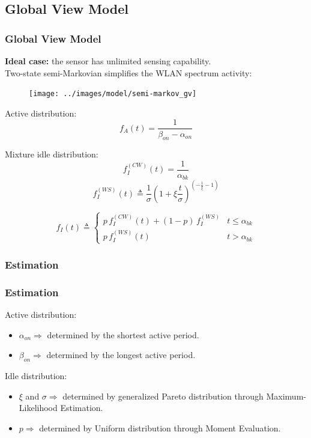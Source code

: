 \documentclass[9pt,handout,serif]{beamer}
\begin{document}
\subsection{Global View Model}
\begin{frame}[c]
	\frametitle{Global View Model}
	\textbf{Ideal case:} the sensor has unlimited sensing capability. \\
	Two-state semi-Markovian simplifies the WLAN spectrum activity:
	\begin{figure}
		\texttt{[image: ../images/model/semi-markov\_gv]}
	\end{figure}
	Active distribution:
	\begin{equation}
		\label{eq:Active}
		f_A(t) = \frac{1}{\beta_{on} - \alpha_{on}}
	\end{equation}
	
	Mixture idle distribution:
	\begin{equation}
		\label{eq:Idle}
		f^{(CW)}_I(t) = \frac{1}{\alpha_{bk}}
	\end{equation}
	\begin{equation}
		\label{eq:Idle}
		f^{(WS)}_I(t) \triangleq \frac{1}{\sigma}(1+\xi\frac{t}{\sigma})^{(-\frac{1}{\xi}-1)}
	\end{equation}
	
	\begin{equation}
		\label{eq:Idle}
		f_I(t) \triangleq
		\begin{cases}
			p \, f^{(CW)}_I(t) + (1 - p) \, f^{(WS)}_I & t \le \alpha_{bk} \\
			p \, f^{(WS)}_I(t) & t > \alpha_{bk}
		\end{cases}
	\end{equation}
		
\end{frame}

\subsubsection*{Estimation}
\begin{frame}[c]
	\frametitle{Estimation}
	Active distribution:
	\begin{itemize}
		\item $\alpha_{on} \Rightarrow$ determined by the shortest active period.
		\item $\beta_{on} \Rightarrow$ determined by the longest active period.
	\end{itemize}
	Idle distribution:
	\begin{itemize}
		\item $\xi$ and $\sigma \Rightarrow$ determined by generalized Pareto distribution through Maximum-Likelihood Estimation.
		\item $p \Rightarrow$ determined by Uniform distribution through Moment Evaluation.
	\end{itemize}
\end{frame}
\end{document}

